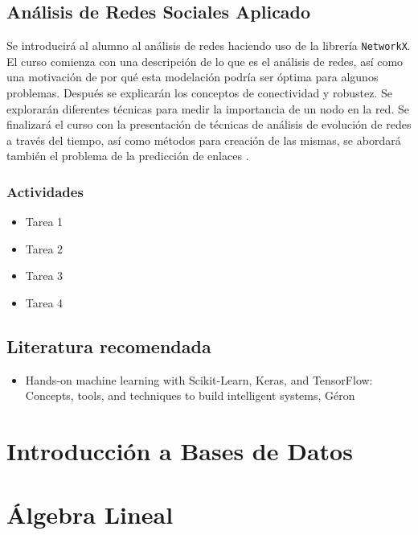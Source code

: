 \documentclass{article}
\begin{document}
        \subsection{Análisis de Redes Sociales Aplicado}

            Se introducirá al alumno al análisis de redes haciendo uso de la librería \texttt{NetworkX}. El curso comienza con una descripción de lo que es el análisis de redes, así como una motivación de por qué esta modelación podría ser óptima para algunos problemas. Después se explicarán los conceptos de conectividad y robustez. Se explorarán diferentes técnicas para medir la importancia de un nodo en la red. Se finalizará el curso con la presentación de técnicas de análisis de evolución de redes a través del tiempo, así como métodos para creación de las mismas, se abordará también el problema de la predicción de enlaces \cite{network-analysis}.

            \subsubsection{Actividades}

                \begin{itemize}
                    \item Tarea 1
                    \item Tarea 2
                    \item Tarea 3
                    \item Tarea 4
                \end{itemize}
        
        \subsection{Literatura recomendada}

            \begin{itemize}
                \item Hands-on machine learning with Scikit-Learn, Keras, and TensorFlow: Concepts, tools, and techniques to build intelligent systems, Géron \cite{geron2019hands}
            \end{itemize}

    \section{Introducción a Bases de Datos}

    \section{Álgebra Lineal}
\end{document}
